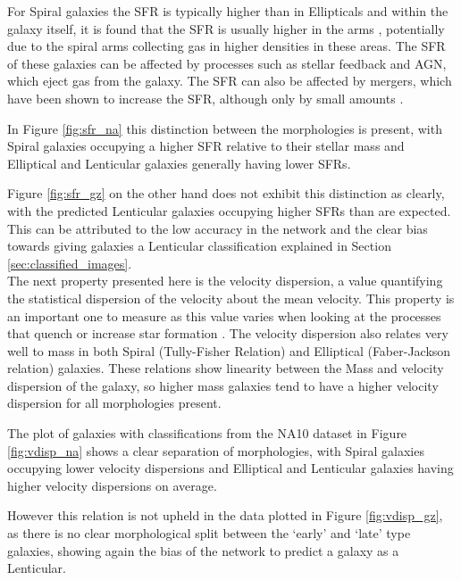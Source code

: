 \documentclass[12pt, onecolumn]{aa}
\begin{document}
For Spiral galaxies the SFR is typically higher than in Ellipticals and within the galaxy itself, it is found that the SFR is usually higher in the arms \citep{2010ApJ...725..534F}, potentially due to the spiral arms collecting gas in higher densities in these areas. The SFR of these galaxies can be affected by processes such as stellar feedback and AGN, which eject gas from the galaxy. The SFR can also be affected by mergers, which have been shown to increase the SFR, although only by small amounts \citep{2019A&A...631A..51P}. 

In Figure \ref{fig:sfr_na} this distinction between the morphologies is present, with Spiral galaxies occupying a higher SFR relative to their stellar mass and Elliptical and Lenticular galaxies generally having lower SFRs. 

Figure \ref{fig:sfr_gz} on the other hand does not exhibit this distinction as clearly, with the predicted Lenticular galaxies occupying higher SFRs than are expected. This can be attributed to the low accuracy in the network and the clear bias towards giving galaxies a Lenticular classification explained in Section \ref{sec:classified_images}. \\

The next property presented here is the velocity dispersion, a value quantifying the statistical dispersion of the velocity about the mean velocity. This property is an important one to measure as this value varies when looking at the processes that quench or increase star formation \citep{2012ApJ...760...62B}. The velocity dispersion also relates very well to mass in both Spiral (Tully-Fisher Relation) and Elliptical (Faber-Jackson relation) galaxies. These relations show linearity between the Mass and velocity dispersion of the galaxy, so higher mass galaxies tend to have a higher velocity dispersion for all morphologies present.

The plot of galaxies with classifications from the NA10 dataset in Figure \ref{fig:vdisp_na} shows a clear separation of morphologies, with Spiral galaxies occupying lower velocity dispersions and Elliptical and Lenticular galaxies having higher velocity dispersions on average. 

However this relation is not upheld in the data plotted in Figure \ref{fig:vdisp_gz}, as there is no clear morphological split between the ‘early’ and ‘late’ type galaxies, showing again the bias of the network to predict a galaxy as a Lenticular. 
\end{document}
